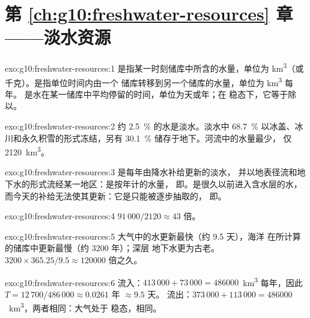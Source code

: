\section*{第 \ref{ch:g10:freshwater-resources} 章——淡水资源}

\begin{solution}{exo:g10:freshwater-resources:1}
是指某一时刻储库中所含的水量，单位为
\unit{km^3}（或千克）。是指单位时间内由一个
储库转移到另一个储库的水量，单位为 \unit{km^3} 每年。
是水在某一储库中平均停留的时间，单位为天或年；在
稳态下，它等于除以。
\end{solution}

\begin{solution}{exo:g10:freshwater-resources:2}
约 \qty{2.5}{\percent} 的水是淡水。淡水中
\qty{68.7}{\percent} 以冰盖、冰川和永久积雪的形式冻结，另有
\qty{30.1}{\percent} 储存于地下。河流中的水量最少，
仅 \num{2120}~\unit{km^3}。
\end{solution}

\begin{solution}{exo:g10:freshwater-resources:3}
是每年由降水补给更新的淡水，
并以地表径流和地下水的形式流经某一地区：是按年计的水量，
即。是很久以前进入含水层的水，
而今天的补给无法使其更新：它是只能被逐步抽取的，
即。
\end{solution}

\begin{solution}{exo:g10:freshwater-resources:4}
$91\,000/2120 \approx 43$ 倍。
\end{solution}

\begin{solution}{exo:g10:freshwater-resources:5}
大气中的水更新最快（约 \num{9.5} 天），海洋
在所计算的储库中更新最慢（约 \num{3200} 年）；深层
地下水更为古老。$3200 \times 365.25/9.5 \approx \num{120000}$
倍之久。
\end{solution}

\begin{solution}{exo:g10:freshwater-resources:6}
流入：$413\,000 + 73\,000 = \num{486000}$~\unit{km^3} 每年，因此
$T = 12\,700/486\,000 \approx \num{0.0261}$ 年 $\approx \num{9.5}$ 天。
流出：$373\,000 + 113\,000 = \num{486000}$~\unit{km^3}，两者相同：大气处于
稳态，相同。
\end{solution}

